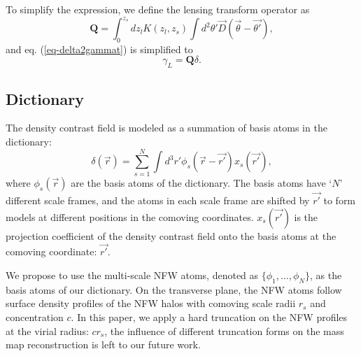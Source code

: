 To simplify the expression, we define the lensing transform operator as
\begin{equation}
\mathbf{Q}=\int_0^{z_s} dz_l K(z_l,z_s) \int d^2 \theta'  \vec{D}(\vec{\theta}-\vec{\theta'}),
\end{equation}
and eq. (\ref{eq-delta2gammat}) is simplified to
\begin{equation} \label{eq-delta2gammat-simp}
\gamma_L=\mathbf{Q}\delta.
\end{equation}

\subsection{Dictionary}
\label{subsec_method_dictionary}

The density contrast field is modeled as a summation of basis atoms in the
dictionary:
\begin{equation}\label{eq-x2delta}
\delta(\vec{r}) = \sum_{s=1}^{N} \int d^3 r' \phi_s(\vec{r}-\vec{r'}) x_s(\vec{r'}),
\end{equation}
where $\phi_s(\vec{r})$ are the basis atoms of the dictionary. The basis atoms
have `$N$' different scale frames, and the atoms in each scale frame are
shifted by $\vec{r'}$ to form models at different positions in the comoving
coordinates.  $x_s(\vec{r'})$ is the projection coefficient of the density
contrast field onto the basis atoms at the comoving coordinate: $\vec{r'}$.

We propose to use the multi-scale NFW atoms, denoted as
$\{\phi_1,...,\phi_N\}$, as the basis atoms of our dictionary.  On the
transverse plane, the NFW atoms follow surface density profiles of the NFW
halos \citep{haloModel-TJ2003-3pt} with comoving scale radii $r_s$ and
concentration $c$. In this paper, we apply a hard truncation on the NFW
profiles at the virial radius: $c r_s$, the influence of different truncation
forms \citep{haloTrunc-Oguri2011} on the mass map reconstruction is left to our
future work.

